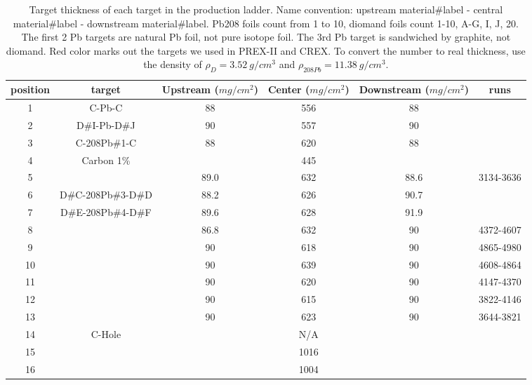 \begin{table}[!htbp]
    \centering
    \begin{tabular}{c | c | c c c c}
	\hline
	position    & target& \makecell{Upstream \\ ($mg/cm^2$)}    & \makecell{Center \\ ($mg/cm^2$)}     & \makecell{Downstream \\ ($mg/cm^2$)}   & runs  \\
	\hline
	1   & C-Pb-C	    & 88    & 556   & 88    & \\
	2   & D\#I-Pb-D\#J      & 90    & 557   & 90    & \\
	\hline
	3   & C-208Pb\#1-C    & 88    & 620   & 88    & \\
	4   & Carbon 1\%    &       & 445   &	    & \\
	\hline
	5   & \color{red}{D\#A-208Pb\#2-D\#B}  & 89.0  & 632   & 88.6  & 3134-3636 \\
	6   & D\#C-208Pb\#3-D\#D  & 88.2  & 626   & 90.7  & \\
	7   & D\#E-208Pb\#4-D\#F  & 89.6  & 628   & 91.9  & \\
	8   & \color{red}{D\#G-208Pb\#5-D\#20} & 86.8  & 632   & 90    & 4372-4607 \\
	9   & \color{red}{D\#1-208Pb\#6-D\#2}  & 90    & 618   & 90    & 4865-4980 \\
	10  & \color{red}{D\#3-208Pb\#7-D\#4}  & 90    & 639   & 90    & 4608-4864 \\
	11  & \color{red}{D\#5-208Pb\#8-D\#6}  & 90    & 620   & 90    & 4147-4370 \\
	12  & \color{red}{D\#7-208Pb\#9-D\#8}  & 90    & 615   & 90    & 3822-4146 \\
	13  & \color{red}{D\#9-208Pb\#10-D\#10}& 90    & 623   & 90    & 3644-3821 \\
	\hline
	14  & C-Hole	    &       & N/A   &       & \\
	15  & \color{red}{\Ca}	    &       & 1016  &       & \\
	16  & \ca	    &       & 1004  &       & \\
	\hline
    \end{tabular}
    \caption{Target thickness of each target in the production ladder. 
    Name convention: upstream material\#label - central material\#label - downstream material\#label. 
    Pb208 foils count from 1 to 10, diomand foils count 1-10, A-G, I, J, 20. 
    The first 2 Pb targets are natural Pb foil, not pure \Pb isotope foil. 
    The 3rd Pb target is sandwiched by graphite, not diomand. Red color marks
    out the targets we used in PREX-II and CREX. To convert the number to real 
    thickness, use the density of $\rho_D = 3.52\ g/cm^3$ and $\rho_{208Pb} 
    = 11.38 \ g/cm^3$.}
    \label{tab:target_thickness}
\end{table}

